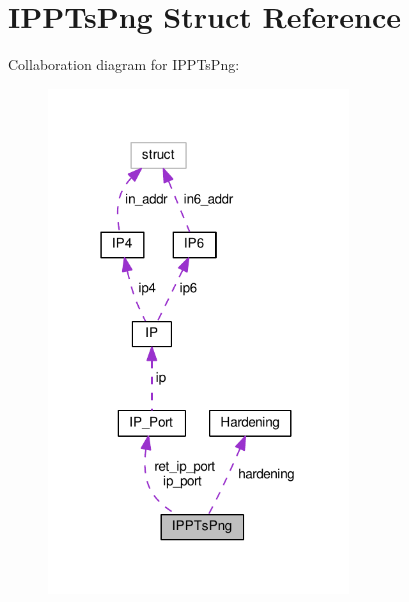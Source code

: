 \hypertarget{struct_i_p_p_ts_png}{\section{I\+P\+P\+Ts\+Png Struct Reference}
\label{struct_i_p_p_ts_png}
}


Collaboration diagram for I\+P\+P\+Ts\+Png\+:\nopagebreak
\begin{figure}[H]
\begin{center}
\leavevmode
\includegraphics[width=226pt]{struct_i_p_p_ts_png__coll__graph}
\end{center}
\end{figure}
